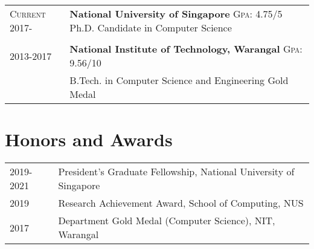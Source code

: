 \documentclass[a4paper,9pt]{article}
\begin{document}
\begin{tabular}{R{2cm}| L{11cm}}
    \textsc{Current} \newline \textsc{2017-} & \textbf{National University of Singapore} \hfill \textsc{Gpa}: 4.75/5  
    \newline Ph.D. Candidate in Computer Science\\
     \\
    2013-2017& \textbf{National Institute of Technology, Warangal}  \hfill \textsc{Gpa}: 9.56/10  \\
    & B.Tech. in Computer Science and Engineering \hfill \small{Gold Medal}\\
\end{tabular}






\section{Honors and Awards}
\vspace{0.1cm}

\begin{tabular}{R{2cm}| L{11cm}}
    2019-2021 & President's Graduate Fellowship, \small{National University of Singapore}\\
    2019 & Research Achievement Award, \small{School of Computing, NUS} \\
    2017 & Department Gold Medal (Computer Science), \small{NIT, Warangal} \\
\end{tabular}
\end{document}
